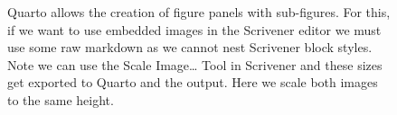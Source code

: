 \documentclass[
  12pt,
  a4paper,
  oneside,
  numbers=noenddot,
  titlepage,
  toclink=all,
  toc=bibliography]{scrbook}
\theoremstyle{definition}
\theoremstyle{definition}
\theoremstyle{definition}
\theoremstyle{plain}
\theoremstyle{plain}
\theoremstyle{plain}
\theoremstyle{plain}
\theoremstyle{plain}
\theoremstyle{remark}
\begin{document}
\begin{figure}

\begin{minipage}[t]{0.44\linewidth}

{\centering 


}

\end{minipage}%
%
\begin{minipage}[t]{0.56\linewidth}

{\centering 


}

\end{minipage}%

\caption{\label{fig-scriv24}Quarto allows the creation of figure panels
with sub-figures. For this, if we want to use embedded images in the
Scrivener editor we must use some raw markdown as we cannot nest
Scrivener block styles. Note we can use the Scale Image\ldots{} Tool in
Scrivener and these sizes get exported to Quarto and the output. Here we
scale both images to the same height.}

\end{figure}
\end{document}
